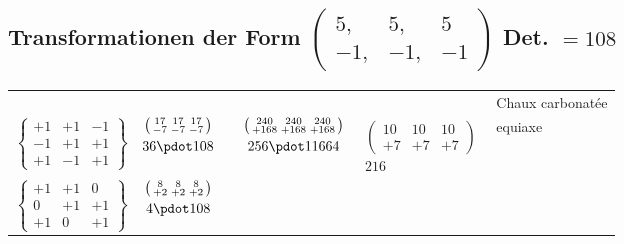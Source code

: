 \subsection*{Transformationen der Form $\left(\begin{smallmatrix}5,&5,&5\\-1,&-1,&-1\end{smallmatrix}\right)$ Det. $=108$}
\begin{center}\scriptsize
\setlength{\tabcolsep}{2pt}
\begin{tabular}{ccccc l}
&&&&&Chaux carbonatée\\
$\left\{\begin{smallmatrix}+1&+1&-1\\-1&+1&+1\\+1&-1&+1\end{smallmatrix}\right\}$&
$\begin{gathered}\left(\begin{smallmatrix}17&17&17\\-7&-7&-7\end{smallmatrix}\right)\\36\pdot108\end{gathered}$&&
$\begin{gathered}\left(\begin{smallmatrix}240&240&240\\+168&+168&+168\end{smallmatrix}\right)\\256\pdot11664\end{gathered}$&
$\begin{gathered}\left(\begin{smallmatrix}10&10&10\\+7&+7&+7\end{smallmatrix}\right)\\216\end{gathered}$&equiaxe\\[1.4ex]
$\left\{\begin{smallmatrix}+1&+1&0\\0&+1&+1\\+1&0&+1\end{smallmatrix}\right\}$&
$\begin{gathered}\left(\begin{smallmatrix}8&8&8\\+2&+2&+2\end{smallmatrix}\right)\\4\pdot108\end{gathered}$&

\end{tabular}
\end{center}
